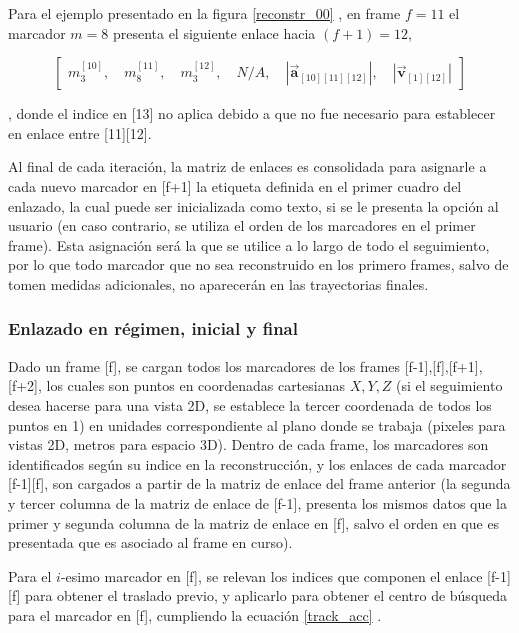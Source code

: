 Para el ejemplo presentado en la figura \ref{reconstr_00} , en frame $f=11$ el marcador $m=8$ presenta el siguiente enlace hacia $(f+1)=12$, 

\begin{equation}
\begin{bmatrix}
  m_{3}^{[10]} ,\quad m_{8}^{[11]} ,\quad m_{3}^{[12]} ,\quad N/A ,\quad \left|\boldsymbol{\overrightarrow{a}}_{[10][11][12]}\right| ,\quad \left|\boldsymbol{\overrightarrow{v}}_{[1][12]}\right|
\end{bmatrix}
\end{equation}

, donde el indice en [13] no aplica debido a que no fue necesario para establecer en enlace entre [11][12].

Al final de cada iteración, la matriz de enlaces es consolidada para asignarle a cada nuevo marcador en [f+1] la etiqueta definida en el primer cuadro del enlazado, la cual puede ser inicializada como texto, si se le presenta la opción al usuario (en caso contrario, se utiliza el orden de los marcadores en el primer frame). Esta asignación será la que se utilice a lo largo de todo el seguimiento, por lo que todo marcador que no sea reconstruido en los primero frames, salvo de tomen medidas adicionales, no aparecerán en las trayectorias finales.

\subsubsection{Enlazado en régimen, inicial y final}

Dado un frame [f], se cargan todos los marcadores de los frames [f-1],[f],[f+1],[f+2], los cuales son puntos en coordenadas cartesianas $X,Y,Z$ (si el seguimiento desea hacerse para una vista 2D, se establece la tercer coordenada de todos los puntos en 1) en unidades correspondiente al plano donde se trabaja (pixeles para vistas 2D, metros para espacio 3D). Dentro de cada frame, los marcadores son identificados según su indice en la reconstrucción, y los enlaces de cada marcador [f-1][f], son cargados a partir de la matriz de enlace del frame anterior (la segunda y tercer columna de la matriz de enlace de [f-1], presenta los mismos datos que la primer y segunda columna de la matriz de enlace en [f], salvo el orden en que es presentada que es asociado al frame en curso).

Para el $i$-esimo marcador en [f], se relevan los indices que componen el enlace [f-1][f] para obtener el traslado previo, y aplicarlo para obtener el centro de búsqueda para el marcador en [f], cumpliendo la ecuación \ref{track_acc} .

